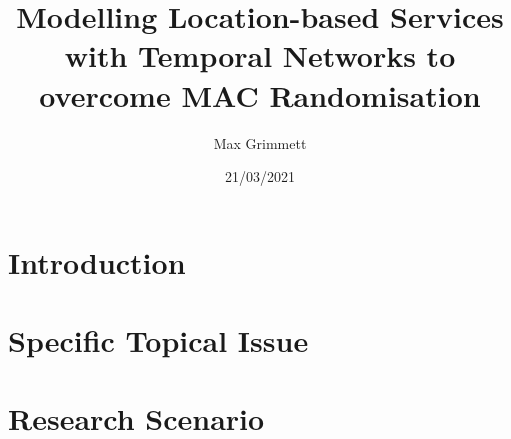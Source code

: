 \documentclass[a4paper]{article}
\title{Modelling Location-based Services with Temporal Networks to overcome MAC Randomisation}
\author{Max Grimmett}
\date{21/03/2021}
\begin{document}
    \maketitle

    \begin{multicols*}{2}

    \section{Introduction}\label{sec:introduction}
    

    \section{Specific Topical Issue}\label{sec:specific-topical-issue}
    

    \section{Research Scenario}\label{sec:research-scenario}
    

    \printbibliography

    \end{multicols*}
\end{document}
